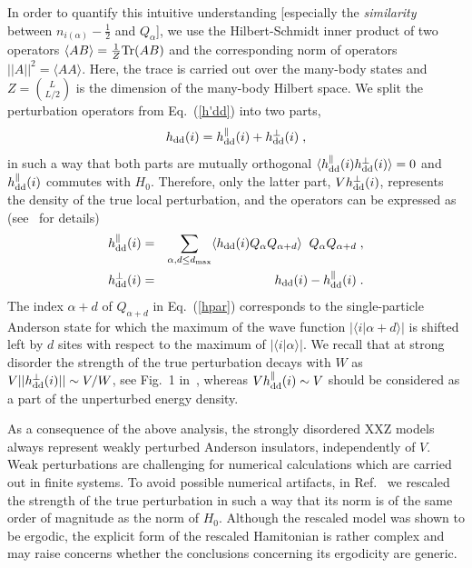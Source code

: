 \documentclass[twocolumn,pre,superscriptaddress,10pt,aps,floatfix]{revtex4-1}
\begin{document}
In order to quantify this intuitive understanding [especially the {\em similarity} between $n_{i(\alpha)}-\frac{1}{2}$ and $Q_{\alpha}$], we use the Hilbert-Schmidt inner product of two operators $\langle A  B \rangle=\frac{1}{Z} {\rm Tr}(A  B)$ and the corresponding norm of operators $||A||^2=\langle A A \rangle$.  Here, the trace is carried out over the many-body states and $Z = {\binom{L}{L/2}}$ is the dimension of the many-body Hilbert space. 
We split the perturbation operators from Eq.~(\ref{h'dd}) into two parts, 
\begin{equation} \label{def_hdd_parts}
h_{\rm dd}(i)=h^{\parallel}_{\rm dd}(i)+h^{\perp}_{\rm dd}(i)\;,
\end{equation}
in such a way that both parts are mutually orthogonal 
$\langle h^{\parallel}_{\rm dd}(i) h^{\perp}_{\rm dd}(i) \rangle=0$ and $h^{\parallel}_{\rm dd}(i)$ commutes with $H_0$. Therefore, only the latter part,  $V h^{\perp}_{\rm dd}(i)$, represents the density of the true local perturbation, and the operators can be expressed as (see~\cite{krajewski_vidmar_22} for details)
\begin{eqnarray}
h^{\parallel}_{\rm dd}(i)&=&\sum_{\alpha,d \le d_{\rm max}} \langle  h_{\rm dd}(i)  Q_{\alpha}Q_{\alpha+d}  \rangle  \;\; Q_{\alpha}Q_{\alpha+d}\;, \label{hpar} \\
h^{\perp}_{\rm dd}(i)&=& h_{\rm dd}(i)  - h^{\parallel}_{\rm dd}(i)\;. \label{hperp} 
\end{eqnarray} 
The index $\alpha+d$ of $Q_{\alpha+d}$ in Eq.~(\ref{hpar}) corresponds to the single-particle Anderson state for which the maximum of the wave function $|\langle i | \alpha+d \rangle|$ is shifted left by $d$ sites with respect to the maximum of $|\langle i | \alpha \rangle|$.
We recall that at strong disorder the strength of the true perturbation decays with $W$ as $V|| h^{\perp}_{\rm dd}(i) || \sim  V/W$, see Fig.~1 in~\cite{krajewski_vidmar_22}, whereas $V   h^{\parallel}_{\rm dd}(i)  \sim  V$ should be considered as a part
of the unperturbed energy density.  

As a consequence of the above analysis, the strongly disordered XXZ models always represent weakly perturbed Anderson insulators, independently of $V$. 
Weak perturbations are challenging for numerical calculations which are carried out in finite systems. To avoid possible numerical artifacts, in Ref.~\cite{krajewski_vidmar_22} we rescaled the strength of the true perturbation in such a way that its norm is of the same order of magnitude as the norm of $H_0$. Although the rescaled model was shown to be ergodic, the explicit form of the rescaled Hamitonian is rather complex and may raise concerns whether the conclusions concerning its ergodicity are generic.
 
\end{document}
